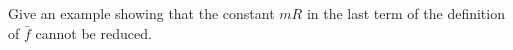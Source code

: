 \begin{exercise}[]{}
\end{exercise}
Give an example showing that the constant $mR$ in the last term of the definition of $\bar f$ cannot be reduced.
\begin{solution}[TODO]
\end{solution}
